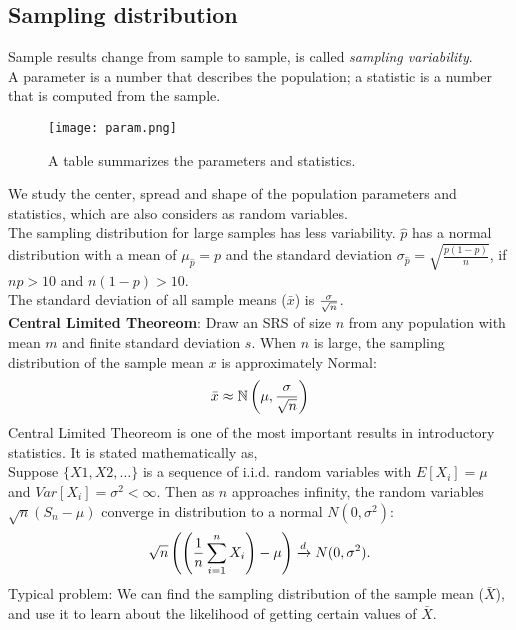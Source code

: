 \documentclass[10pt, a4paper]{article}
\begin{document}
\subsection{Sampling distribution}
Sample results change from sample to sample, is called \emph{sampling variability}.\\
A parameter is a number that describes the population; a statistic is a number that is computed from the sample.
\begin{figure}
[h!]
\centering
\texttt{[image: param.png]}
\caption{A table summarizes the parameters and statistics.}
\end{figure}
We study the center, spread and shape of the population parameters and statistics, which are also considers as random variables.\\
The sampling distribution for large samples has less variability. $\hat{p}$ has a normal distribution with a mean of $\mu_{\hat{p}}=p$ and the standard deviation $\sigma_{\hat{p}}=\sqrt{\frac{p(1-p)}{n}}$, if $np > 10$ and $n(1-p)>10$.\\
The standard deviation of all sample means ($\bar{x}$) is ${\sigma \over \sqrt{n}}$.\\[1mm]
\textbf{Central Limited Theoreom}: Draw an SRS of size $n$ from any population with mean $m$ and finite standard deviation $s$. When $n$ is large, the sampling distribution of the sample mean $x$ is approximately Normal:
\[
\bar{x}\approx \mathbb{N} \left( \mu, {\sigma \over \sqrt{n}} \right)
\]
Central Limited Theoreom is one of the most important results in introductory statistics. It is stated mathematically as,\\
Suppose $\{X1, X2,\dots\}$ is a sequence of i.i.d. random variables with $E[X_i] = \mu$ and $Var[X_i] = \sigma^2 < \infty$. Then as $n$ approaches infinity, the random variables $\sqrt{n}(S_n − \mu)$ converge in distribution to a normal $N(0, \sigma^2)$:
\begin{equation}
    \sqrt{n} \left( \left( {1 \over n} \sum_{ i = 1}^n X_i \right)-\mu \right) \xrightarrow[]{d} N ( 0 , \sigma^2 ) . 
\end{equation}
Typical problem: We can find the sampling distribution of the sample mean ($\bar{X}$), and use it to learn about the likelihood of getting certain values of $\bar{X}$.\\[1mm]
\end{document}
